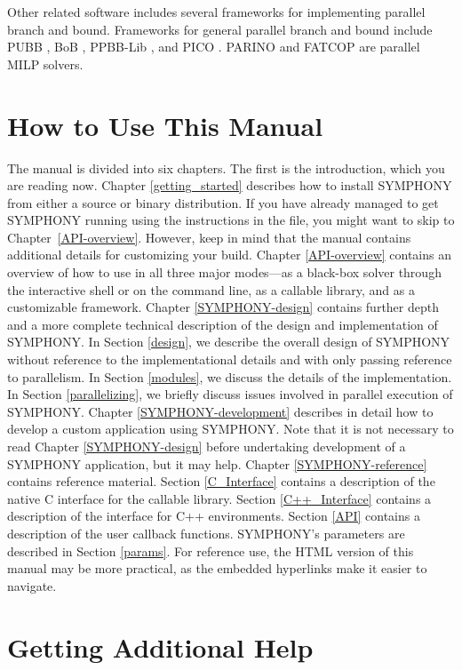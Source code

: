 Other related software includes several frameworks for implementing parallel
branch and bound. Frameworks for general parallel branch and bound include
PUBB \cite{PUBB}, BoB \cite{BoB}, PPBB-Lib \cite{PPBB-Lib}, and PICO
\cite{PICO}. PARINO \cite{PARINO} and FATCOP \cite{chen:fatcop2} are parallel
MILP solvers.

\section{How to Use This Manual}

The manual is divided into six chapters. The first is the introduction, which
you are reading now. Chapter \ref{getting_started} describes how to install
SYMPHONY from either a source or binary distribution. If you have already
managed to get SYMPHONY running using the instructions in the 
file, you might want to skip to Chapter~\ref{API-overview}. However, keep in
mind that the manual contains additional details for customizing your build.
Chapter \ref{API-overview} contains an overview of how to use in all three
major modes---as a black-box solver through the interactive shell or on the
command line, as a callable library, and as a customizable framework. Chapter
\ref{SYMPHONY-design} contains further depth and a more complete technical
description of the design and implementation of SYMPHONY. In Section
\ref{design}, we describe the overall design of SYMPHONY without reference to
the implementational details and with only passing reference to parallelism.
In Section \ref{modules}, we discuss the details of the implementation. In
Section \ref{parallelizing}, we briefly discuss issues involved in parallel
execution of SYMPHONY. Chapter \ref{SYMPHONY-development} describes in detail
how to develop a custom application using SYMPHONY. Note that it is not
necessary to read Chapter \ref{SYMPHONY-design} before undertaking development
of a SYMPHONY application, but it may help. Chapter \ref{SYMPHONY-reference}
contains reference material. Section \ref{C_Interface} contains a description
of the native C interface for the callable library. Section
\ref{C++_Interface} contains a description of the interface for C++
environments. Section \ref{API} contains a description of the user callback
functions. SYMPHONY's parameters are described in Section \ref{params}. For
reference use, the HTML version of this manual may be more practical, as the
embedded hyperlinks make it easier to navigate.

\section{Getting Additional Help}
\label{resources}

